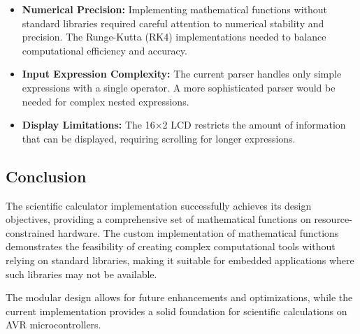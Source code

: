 \documentclass[12pt]{article}
\begin{document}
\begin{itemize}
    \item \textbf{Numerical Precision:} Implementing mathematical functions without standard libraries required careful attention to numerical stability and precision. The Runge-Kutta (RK4) implementations needed to balance computational efficiency and accuracy.

    \item \textbf{Input Expression Complexity:} The current parser handles only simple expressions with a single operator. A more sophisticated parser would be needed for complex nested expressions.

    \item \textbf{Display Limitations:} The 16×2 LCD restricts the amount of information that can be displayed, requiring scrolling for longer expressions.
\end{itemize}

\subsection{Conclusion}
The scientific calculator implementation successfully achieves its design objectives, providing a comprehensive set of mathematical functions on resource-constrained hardware. The custom implementation of mathematical functions demonstrates the feasibility of creating complex computational tools without relying on standard libraries, making it suitable for embedded applications where such libraries may not be available.

The modular design allows for future enhancements and optimizations, while the current implementation provides a solid foundation for scientific calculations on AVR microcontrollers.
\end{document}
